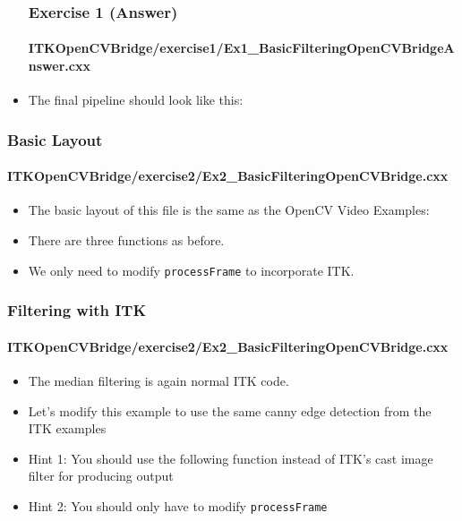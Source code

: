 \begin{frame}
\begin{itemize}
\frametitle{Exercise 1 (Answer)}
\framesubtitle{ITKOpenCVBridge/exercise1/Ex1\_BasicFilteringOpenCVBridgeAnswer.cxx}
\item The final pipeline should look like this:
\end{itemize}
\end{frame}


\begin{frame}
\frametitle{Basic Layout}
\framesubtitle{ITKOpenCVBridge/exercise2/Ex2\_BasicFilteringOpenCVBridge.cxx}
\begin{itemize}
\item The basic layout of this file is the same as the OpenCV Video
  Examples:
\item There are three functions as before.
\pause
\item We only need to modify {\tt processFrame} to incorporate ITK.
\end{itemize}
\end{frame}

\begin{frame}
\frametitle{Filtering with ITK}
\framesubtitle{ITKOpenCVBridge/exercise2/Ex2\_BasicFilteringOpenCVBridge.cxx}
\begin{itemize}
\item The median filtering is again normal ITK code.
\end{itemize}
\end{frame}

\begin{frame}
\begin{itemize}
\frametitle{Exercise 2}
\framesubtitle{ITKOpenCVBridge/exercise2/Ex2\_BasicFilteringOpenCVBridge.cxx}
\item Let's modify this example to use the same canny edge detection
  from the ITK examples
\pause 
\item Hint 1: You should use the following function instead of ITK's
cast image filter for producing output
\pause
\item Hint 2: You should only have to modify {\tt processFrame}
\end{itemize}
\end{frame}

